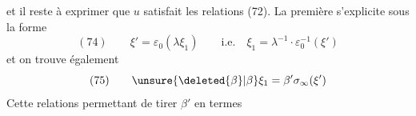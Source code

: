 et il reste à exprimer que $u$ satisfait les relations (72). La première s'explicite sous la forme
\[
(74)\qquad\xi'=\varepsilon_0(\lambda\xi_1)\qquad\text{i.e.}\quad\xi_1=\lambda^{-1}\cdot\varepsilon_0^{-1}(\xi')
\]
et on trouve également
\[
(75)\qquad\unsure{\deleted{\beta}|\beta}\xi_1=\beta'\sigma_\infty(\xi')
\]
Cette relations permettant de tirer $\beta'$ en termes

